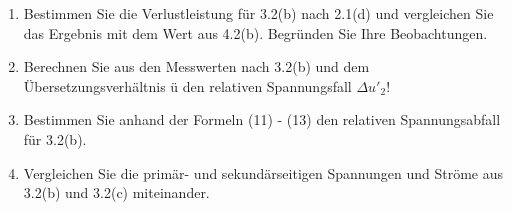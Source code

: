 \begin{enumerate}[label=\alph*)]
	\item Bestimmen Sie die Verlustleistung für 3.2(b) nach 2.1(d) und vergleichen Sie
	      das Ergebnis mit dem Wert aus 4.2(b). Begründen Sie Ihre Beobachtungen.

	\item Berechnen Sie aus den Messwerten nach 3.2(b) und dem Übersetzungsverhältnis ü
	      den relativen Spannungsfall $\Delta u'_2$!

	\item Bestimmen Sie anhand der Formeln (11) - (13) den relativen Spannungsabfall für
	      3.2(b).

	\item Vergleichen Sie die primär- und sekundärseitigen Spannungen und Ströme aus
	      3.2(b) und 3.2(c) miteinander.
\end{enumerate}
